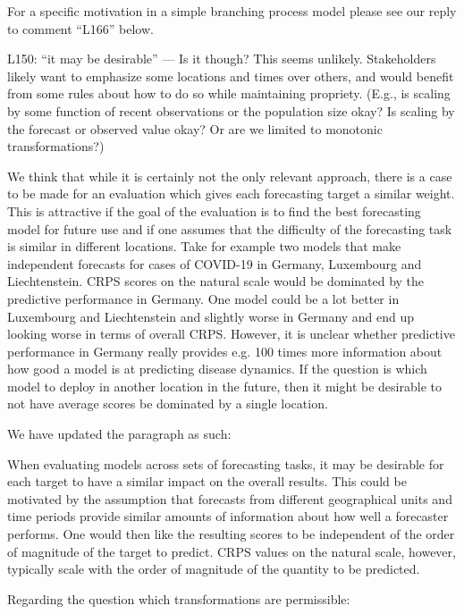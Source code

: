 \documentclass{article}
\newcommand{\black}{\color{black}}
\newcommand{\blue}{\color{blue}}
\newcommand{\indented}{\setlength{\leftskip}{1cm}}
\newcommand{\notindented}{\setlength{\leftskip}{0cm}}
\begin{document}
\notindented

For a specific motivation in a simple branching process model please see our reply to comment ``L166'' below.


\blue
L150: “it may be desirable” — Is it though? This seems unlikely. Stakeholders likely want to emphasize some locations and times over others, and would benefit from some rules about how to do so while maintaining propriety. (E.g., is scaling by some function of recent observations or the population size okay? Is scaling by the forecast or observed value okay? Or are we limited to monotonic transformations?)

\black
We think that while it is certainly not the only relevant approach, there is a case to be made for an evaluation which gives each forecasting target a similar weight. This is attractive if the goal of the evaluation is to find the best forecasting model for future use and if one assumes that the difficulty of the forecasting task is similar in different locations. Take for example two models that make independent forecasts for cases of COVID-19 in Germany, Luxembourg and Liechtenstein. CRPS scores on the natural scale would be dominated by the predictive performance in Germany. One model could be a lot better in Luxembourg and Liechtenstein and slightly worse in Germany and end up looking worse in terms of overall CRPS. However, it is unclear whether predictive performance in Germany really provides e.g. 100 times more information about how good a model is at predicting disease dynamics. If the question is which model to deploy in another location in the future, then it might be desirable to not have average scores be dominated by a single location. 

We have updated the paragraph as such: 

\indented
When evaluating models across sets of forecasting tasks, it may be desirable for each target to have a similar impact on the overall results. This could be motivated by the assumption that forecasts from different geographical units and time periods provide similar amounts of information about how well a forecaster performs. One would then like the resulting scores to be independent of the order of magnitude of the target to predict. CRPS values on the natural scale, however, typically scale with the order of magnitude of the quantity to be predicted.

\notindented

Regarding the question which transformations are permissible: 
\end{document}
